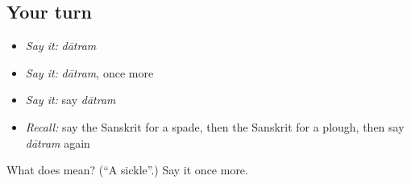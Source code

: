 \subsection*{Your turn}
\begin{itemize}
\raggedright
  \item \emph{Say it:} \emph{dātram}
  \item \emph{Say it:} \emph{dātram}, once more
  \item \emph{Say it:} say \emph{dātram}
  \item \emph{Recall:} say the Sanskrit for a spade, then the Sanskrit for a plough, then say \emph{dātram} again
\end{itemize}

\begin{tcolorbox}[breakable,colback=teal!4,colframe=teal!35!black,title={Before you move on}]
What does  mean? (\textquotedblleft{}A sickle\textquotedblright{}.) Say it once more.
\end{tcolorbox}
